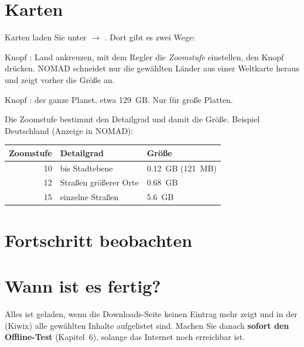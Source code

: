 \section{Karten}
Karten laden Sie unter  $\rightarrow$ . Dort gibt es zwei Wege:
\begin{description}[leftmargin=1.2em,style=nextline]
\item[Nach Land oder Region (empfohlen)] Knopf : Land ankreuzen, mit dem Regler die \emph{Zoomstufe} einstellen, den Knopf  drücken. NOMAD schneidet nur die gewählten Länder aus einer Weltkarte heraus und zeigt vorher die Größe an.
\item[Weltkarte] Knopf : der ganze Planet, etwa \SI{129}{GB}. Nur für große Platten.
\end{description}
Die Zoomstufe bestimmt den Detailgrad und damit die Größe. Beispiel Deutschland (Anzeige in NOMAD):

\begin{center}\small
\renewcommand{\arraystretch}{1.25}
\begin{tabular}{@{}rll@{}}
\toprule
\textbf{Zoomstufe} & \textbf{Detailgrad} & \textbf{Größe} \\
\midrule
10 & bis Stadtebene & \SI{0,12}{GB} (121~MB) \\
12 & Straßen größerer Orte & \SI{0,68}{GB} \\
15 & einzelne Straßen & \SI{5,6}{GB} \\
\bottomrule
\end{tabular}
\end{center}


\section{Fortschritt beobachten}

\section{Wann ist es fertig?}
Alles ist geladen, wenn die Downloads-Seite keinen Eintrag mehr zeigt und in der  (Kiwix) alle gewählten Inhalte aufgelistet sind. Machen Sie danach \textbf{sofort den Offline-Test} (Kapitel~6), solange das Internet noch erreichbar ist.

